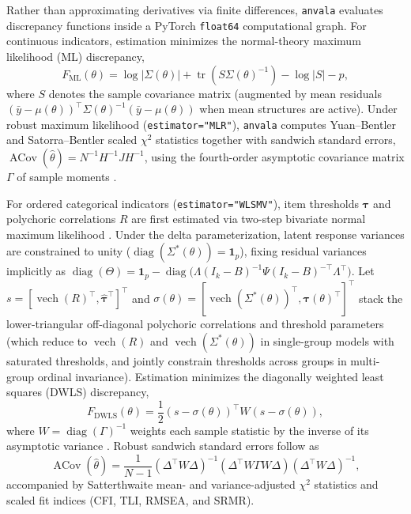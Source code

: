 ﻿\documentclass[12pt,letterpaper]{article}
\begin{document}
Rather than approximating derivatives via finite differences, \texttt{anvala} evaluates discrepancy functions inside a PyTorch \texttt{float64} computational graph. For continuous indicators, estimation minimizes the normal-theory maximum likelihood (ML) discrepancy,
\begin{equation}
F_{\mathrm{ML}}(\theta) = \log|\Sigma(\theta)| + \operatorname{tr}\!\left(S\Sigma(\theta)^{-1}\right) - \log|S| - p,
\label{eq:fml}
\end{equation}
where $S$ denotes the sample covariance matrix (augmented by mean residuals $( \bar{y} - \mu(\theta) )^{\top} \Sigma(\theta)^{-1} ( \bar{y} - \mu(\theta) )$ when mean structures are active). Under robust maximum likelihood (\texttt{estimator="MLR"}), \texttt{anvala} computes Yuan--Bentler and Satorra--Bentler scaled $\chi^2$ statistics together with sandwich standard errors, $\operatorname{ACov}(\hat{\theta}) = N^{-1} H^{-1} J H^{-1}$, using the fourth-order asymptotic covariance matrix $\Gamma$ of sample moments \parencite{satorra2001, yuan2000}.

For ordered categorical indicators (\texttt{estimator="WLSMV"}), item thresholds $\boldsymbol{\tau}$ and polychoric correlations $R$ are first estimated via two-step bivariate normal maximum likelihood \parencite{olsson1979}. Under the delta parameterization, latent response variances are constrained to unity ($\operatorname{diag}(\Sigma^*(\theta)) = \mathbf{1}_p$), fixing residual variances implicitly as $\operatorname{diag}(\Theta) = \mathbf{1}_p - \operatorname{diag}\bigl(\Lambda (I_k - B)^{-1} \Psi (I_k - B)^{-\top} \Lambda^{\top}\bigr)$. Let $s = [\operatorname{vech}(R)^{\top}, \hat{\boldsymbol{\tau}}^{\top}]^{\top}$ and $\sigma(\theta) = [\operatorname{vech}(\Sigma^*(\theta))^{\top}, \boldsymbol{\tau}(\theta)^{\top}]^{\top}$ stack the lower-triangular off-diagonal polychoric correlations and threshold parameters (which reduce to $\operatorname{vech}(R)$ and $\operatorname{vech}(\Sigma^*(\theta))$ in single-group models with saturated thresholds, and jointly constrain thresholds across groups in multi-group ordinal invariance). Estimation minimizes the diagonally weighted least squares (DWLS) discrepancy,
\begin{equation}
F_{\mathrm{DWLS}}(\theta) = \frac{1}{2}\left(s - \sigma(\theta)\right)^{\top} W \left(s - \sigma(\theta)\right),
\label{eq:dwls}
\end{equation}
where $W = \operatorname{diag}(\Gamma)^{-1}$ weights each sample statistic by the inverse of its asymptotic variance \parencite{muthen1984}. Robust sandwich standard errors follow as
\begin{equation}
\operatorname{ACov}(\hat{\theta}) = \frac{1}{N - 1}\left(\Delta^{\top} W \Delta\right)^{-1} \left(\Delta^{\top} W \Gamma W \Delta\right) \left(\Delta^{\top} W \Delta\right)^{-1},
\label{eq:wlsmv_vcov}
\end{equation}
accompanied by Satterthwaite mean- and variance-adjusted $\chi^2$ statistics and scaled fit indices (CFI, TLI, RMSEA, and SRMR).
\end{document}
